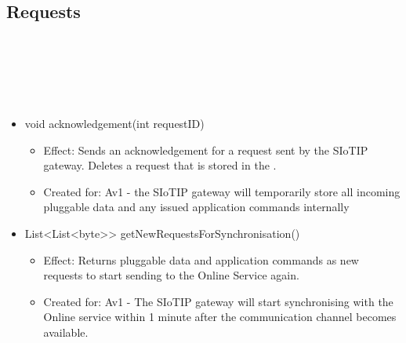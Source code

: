   \subsection{Requests}\label{int:GatewayGatewayOnlineServiceCommunicationHandlerRequestStoreRequests}
    \begin{description}
      \item[Provided by:] \iconcomponent{}~
      \item[Required by:] \iconcomponent{}~
      \item[Operations:] ~
    \begin{itemize}[noitemsep,nolistsep,leftmargin=-.25cm]
      \item \textsf{void acknowledgement(int requestID)}
        \begin{itemize}[noitemsep,nolistsep]
           \item Effect: Sends an acknowledgement for a request sent by the SIoTIP gateway. Deletes a request that is stored in the .
\item Created for: Av1 - the SIoTIP gateway will temporarily store all incoming pluggable data and any issued application commands internally
        \end{itemize}
      \item \textsf{List\textless{}List\textless{}byte\textgreater{}\textgreater{} getNewRequestsForSynchronisation()}
        \begin{itemize}[noitemsep,nolistsep]
           \item Effect: Returns pluggable data and application commands as new requests to start sending to the Online Service again.
\item Created for: Av1 - The SIoTIP gateway will start synchronising with the Online service within 1 minute after the communication channel becomes available.
        \end{itemize}
    \end{itemize}
    \end{description}

